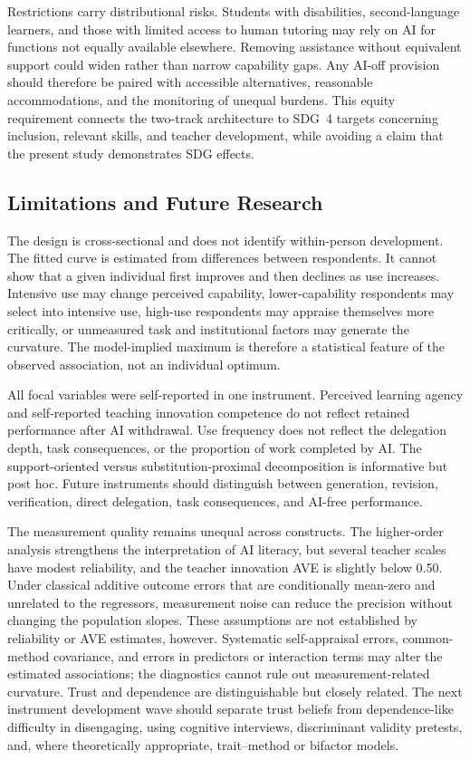 \documentclass[sustainability,article,accept,moreauthors]{Definitions/mdpi}
\begin{document}
Restrictions carry distributional risks. Students with disabilities, second-language learners, and those with limited access to human tutoring may rely on AI for functions not equally available elsewhere. Removing assistance without equivalent support could widen rather than narrow capability gaps. Any AI-off provision should therefore be paired with accessible alternatives, reasonable accommodations, and the monitoring of unequal burdens. This equity requirement connects the two-track architecture to SDG~4 targets concerning inclusion, relevant skills, and teacher development, while avoiding a claim that the present study demonstrates SDG effects.

\subsection{Limitations and Future Research}\label{sec:limits}

The design is cross-sectional and does not identify within-person development. The fitted curve is estimated from differences between respondents. It cannot show that a given individual first improves and then declines as use increases. Intensive use may change perceived capability, lower-capability respondents may select into intensive use, high-use respondents may appraise themselves more critically, or unmeasured task and institutional factors may generate the curvature. The model-implied maximum is therefore a statistical feature of the observed association, not an individual optimum.

All focal variables were self-reported in one instrument. Perceived learning agency and self-reported teaching innovation competence do not reflect retained performance after AI withdrawal. Use frequency does not reflect the delegation depth, task consequences, or the proportion of work completed by AI. The support-oriented versus substitution-proximal decomposition is informative but post hoc. Future instruments should distinguish between generation, revision, verification, direct delegation, task consequences, and AI-free performance.

The measurement quality remains unequal across constructs. The higher-order analysis strengthens the interpretation of AI literacy, but several teacher scales have modest reliability, and the teacher innovation AVE is slightly below 0.50. Under classical additive outcome errors that are conditionally mean-zero and unrelated to the regressors, measurement noise can reduce the precision without changing the population slopes. These assumptions are not established by reliability or AVE estimates, however. Systematic self-appraisal errors, common-method covariance, and errors in predictors or interaction terms may alter the estimated associations; the diagnostics cannot rule out measurement-related curvature. Trust and dependence are distinguishable but closely related. The next instrument development wave should separate trust beliefs from dependence-like difficulty in disengaging, using cognitive interviews, discriminant validity pretests, and, where theoretically appropriate, trait--method or bifactor models.
\end{document}
